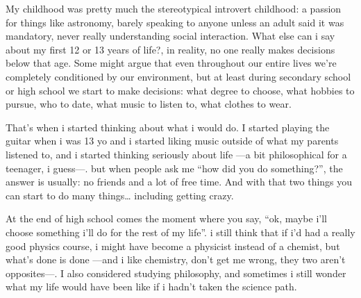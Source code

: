 My childhood was pretty much the stereotypical introvert childhood: a
passion for things like astronomy, barely speaking to anyone unless an
adult said it was mandatory, never really understanding social interaction.
What else can i say about my first 12 or 13 years of life?, in reality, no
one really makes decisions below that age. Some might argue that even
throughout our entire lives we're completely conditioned by our
environment, but at least during secondary school or high school we start
to make decisions: what degree to choose, what hobbies to pursue, who to
date, what music to listen to, what clothes to wear.

That's when i started thinking about what i would do. I started playing the
guitar when i was 13 yo and i started liking music outside of what my parents
listened to, and i started thinking seriously about life ---a bit philosophical
for a teenager, i guess---. but when people ask me ``how did you do
something?'', the answer is usually: no friends and a lot of free time. And
with that two things you can start to do many things\ldots{} including getting
crazy.

At the end of high school comes the moment where you say, ``ok, maybe i'll
choose something i'll do for the rest of my life''. i still think that if
i'd had a really good physics course, i might have become a physicist
instead of a chemist, but what's done is done ---and i like chemistry, don't
get me wrong, they two aren't opposites---. I also considered studying
philosophy, and sometimes i still wonder what my life would have been
like if i hadn't taken the science path.

